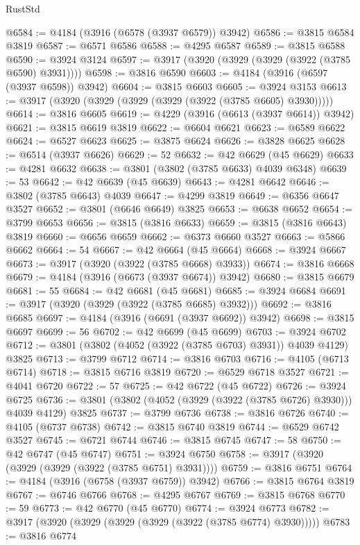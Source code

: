 \begin{lexlean}{RustStd}
\begin{coremodule}
@6584 := @4184 (@3916 (@6578 (@3937 @6579)) @3942)
@6586 := @3815 @6584 @3819
@6587 := @6571 @6586
@6588 := @4295 @6587
@6589 := @3815 @6588
@6590 := @3924 @3124
@6597 := @3917 (@3920 (@3929 (@3929 (@3922 (@3785 @6590) @3931))))
@6598 := @3816 @6590
@6603 := @4184 (@3916 (@6597 (@3937 @6598)) @3942)
@6604 := @3815 @6603
@6605 := @3924 @3153
@6613 := @3917 (@3920 (@3929 (@3929 (@3929 (@3922 (@3785 @6605) @3930)))))
@6614 := @3816 @6605
@6619 := @4229 (@3916 (@6613 (@3937 @6614)) @3942)
@6621 := @3815 @6619 @3819
@6622 := @6604 @6621
@6623 := @6589 @6622
@6624 := @6527 @6623
@6625 := @3875 @6624
@6626 := @3828 @6625
@6628 := @6514 (@3937 @6626)
@6629 := 52
@6632 := @42 @6629 (@45 @6629)
@6633 := @4281 @6632
@6638 := @3801 (@3802 (@3785 @6633) @4039 @6348)
@6639 := 53
@6642 := @42 @6639 (@45 @6639)
@6643 := @4281 @6642
@6646 := @3802 (@3785 @6643) @4039
@6647 := @4299 @3819
@6649 := @6356 @6647 @3527
@6652 := @3801 (@6646 @6649) @3825
@6653 := @6638 @6652
@6654 := @3799 @6653
@6656 := @3815 (@3816 @6633)
@6659 := @3815 (@3816 @6643) @3819
@6660 := @6656 @6659
@6662 := @6373 @6660 @3527
@6663 := @5866 @6662
@6664 := 54
@6667 := @42 @6664 (@45 @6664)
@6668 := @3924 @6667
@6673 := @3917 (@3920 (@3922 (@3785 @6668) @3933))
@6674 := @3816 @6668
@6679 := @4184 (@3916 (@6673 (@3937 @6674)) @3942)
@6680 := @3815 @6679
@6681 := 55
@6684 := @42 @6681 (@45 @6681)
@6685 := @3924 @6684
@6691 := @3917 (@3920 (@3929 (@3922 (@3785 @6685) @3932)))
@6692 := @3816 @6685
@6697 := @4184 (@3916 (@6691 (@3937 @6692)) @3942)
@6698 := @3815 @6697
@6699 := 56
@6702 := @42 @6699 (@45 @6699)
@6703 := @3924 @6702
@6712 := @3801 (@3802 (@4052 (@3922 (@3785 @6703) @3931)) @4039 @4129) @3825
@6713 := @3799 @6712
@6714 := @3816 @6703
@6716 := @4105 (@6713 @6714)
@6718 := @3815 @6716 @3819
@6720 := @6529 @6718 @3527
@6721 := @4041 @6720
@6722 := 57
@6725 := @42 @6722 (@45 @6722)
@6726 := @3924 @6725
@6736 := @3801 (@3802 (@4052 (@3929 (@3922 (@3785 @6726) @3930))) @4039 @4129) @3825
@6737 := @3799 @6736
@6738 := @3816 @6726
@6740 := @4105 (@6737 @6738)
@6742 := @3815 @6740 @3819
@6744 := @6529 @6742 @3527
@6745 := @6721 @6744
@6746 := @3815 @6745
@6747 := 58
@6750 := @42 @6747 (@45 @6747)
@6751 := @3924 @6750
@6758 := @3917 (@3920 (@3929 (@3929 (@3922 (@3785 @6751) @3931))))
@6759 := @3816 @6751
@6764 := @4184 (@3916 (@6758 (@3937 @6759)) @3942)
@6766 := @3815 @6764 @3819
@6767 := @6746 @6766
@6768 := @4295 @6767
@6769 := @3815 @6768
@6770 := 59
@6773 := @42 @6770 (@45 @6770)
@6774 := @3924 @6773
@6782 := @3917 (@3920 (@3929 (@3929 (@3929 (@3922 (@3785 @6774) @3930)))))
@6783 := @3816 @6774

\end{coremodule}
\end{lexlean}

